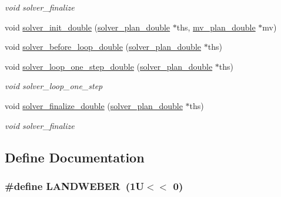 \begin{CompactItemize}
\begin{CompactList}\small\item\em void solver\_\-finalize \item\end{CompactList}\item 
\hypertarget{group__solver_g64cfaa8d4478850d5e95b910c7235e30}{
void \hyperlink{group__solver_g64cfaa8d4478850d5e95b910c7235e30}{solver\_\-init\_\-double} (\hyperlink{structsolver__plan__double}{solver\_\-plan\_\-double} $\ast$ths, \hyperlink{structmv__plan__double}{mv\_\-plan\_\-double} $\ast$mv)}
\label{group__solver_g64cfaa8d4478850d5e95b910c7235e30}

\item 
\hypertarget{group__solver_g101de2753c7c709e635b7c70a5fb5fe8}{
void \hyperlink{group__solver_g101de2753c7c709e635b7c70a5fb5fe8}{solver\_\-before\_\-loop\_\-double} (\hyperlink{structsolver__plan__double}{solver\_\-plan\_\-double} $\ast$ths)}
\label{group__solver_g101de2753c7c709e635b7c70a5fb5fe8}

\item 
\hypertarget{group__solver_gd4f10ac01c0f0361e6c12b9c522ae5f6}{
void \hyperlink{group__solver_gd4f10ac01c0f0361e6c12b9c522ae5f6}{solver\_\-loop\_\-one\_\-step\_\-double} (\hyperlink{structsolver__plan__double}{solver\_\-plan\_\-double} $\ast$ths)}
\label{group__solver_gd4f10ac01c0f0361e6c12b9c522ae5f6}

\begin{CompactList}\small\item\em void solver\_\-loop\_\-one\_\-step \item\end{CompactList}\item 
\hypertarget{group__solver_g1b474dc7b8c84ac43e6c8cb2b5a66e47}{
void \hyperlink{group__solver_g1b474dc7b8c84ac43e6c8cb2b5a66e47}{solver\_\-finalize\_\-double} (\hyperlink{structsolver__plan__double}{solver\_\-plan\_\-double} $\ast$ths)}
\label{group__solver_g1b474dc7b8c84ac43e6c8cb2b5a66e47}

\begin{CompactList}\small\item\em void solver\_\-finalize \item\end{CompactList}\end{CompactItemize}


\subsection{Define Documentation}
\hypertarget{group__solver_g84bae5d48296d5a0d1e548ed58b9e495}{
\subsubsection{\setlength{\rightskip}{0pt plus 5cm}\#define LANDWEBER~(1U$<$$<$ 0)}}
\label{group__solver_g84bae5d48296d5a0d1e548ed58b9e495}


